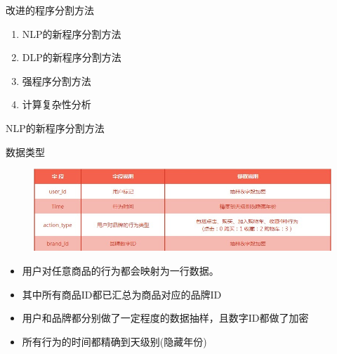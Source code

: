 \documentclass{beamer}
\begin{document}

\begin{frame}[t]{改进的程序分割方法}
	\begin{enumerate}
		\item NLP的新程序分割方法
		\item DLP的新程序分割方法
		\item 强程序分割方法
		\item 计算复杂性分析
	\end{enumerate}
\end{frame}


\begin{frame}[t]{NLP的新程序分割方法}
\end{frame}








\begin{frame}{数据类型}

\begin{figure}
\includegraphics[width=\linewidth]{./data_info}
\end{figure}

\begin{itemize}
\item 用户对任意商品的行为都会映射为一行数据。
\item 其中所有商品ID都已汇总为商品对应的品牌ID
\item 用户和品牌都分别做了一定程度的数据抽样，且数字ID都做了加密
\item 所有行为的时间都精确到天级别(隐藏年份)
\end{itemize}

\end{frame}
\end{document}
